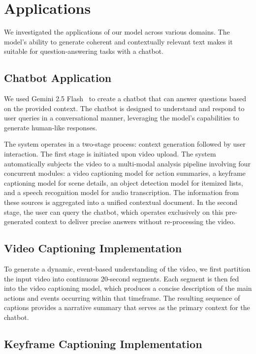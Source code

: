 \section{Applications}

We investigated the applications of our model across various domains. The model's ability to generate coherent and contextually relevant text makes it suitable for question-answering tasks with a chatbot.



\subsection{Chatbot Application}

We used Gemini 2.5 Flash~\cite{comanici2025gemini} to create a chatbot that can answer questions based on the provided context. The chatbot is designed to understand and respond to user queries in a conversational manner, leveraging the model's capabilities to generate human-like responses.

The system operates in a two-stage process: context generation followed by user interaction. The first stage is initiated upon video upload. The system automatically subjects the video to a multi-modal analysis pipeline involving four concurrent modules: a video captioning model for action summaries, a keyframe captioning model for scene details, an object detection model for itemized lists, and a speech recognition model for audio transcription. The information from these sources is aggregated into a unified contextual document. In the second stage, the user can query the chatbot, which operates exclusively on this pre-generated context to deliver precise answers without re-processing the video.

\subsection{Video Captioning Implementation}

To generate a dynamic, event-based understanding of the video, we first partition the input video into continuous 20-second segments. Each segment is then fed into the video captioning model, which produces a concise description of the main actions and events occurring within that timeframe. The resulting sequence of captions provides a narrative summary that serves as the primary context for the chatbot.


\subsection{Keyframe Captioning Implementation}

